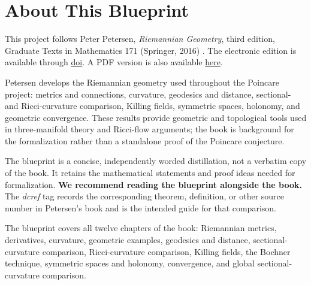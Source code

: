 
\chapter*{About This Blueprint}

This project follows Peter Petersen, \emph{Riemannian Geometry}, third edition,
Graduate Texts in Mathematics 171 (Springer, 2016) \cite{petersen2016}. The
electronic edition is available through
\href{https://doi.org/10.1007/978-3-319-26654-1}{doi}.
A PDF version is also available
\href{https://ebooks.karbust.me/Mathematics/Peter\%20Petersen\%20-\%20Riemannian\%20Geometry\%20(1998)\%20[978-1-4757-6434-5].pdf}{here}.

Petersen develops the Riemannian geometry used throughout the Poincare
project: metrics and connections, curvature, geodesics and distance,
sectional- and Ricci-curvature comparison, Killing fields, symmetric spaces,
holonomy, and geometric convergence. These results provide geometric and
topological tools used in three-manifold theory and Ricci-flow arguments; the
book is background for the formalization rather than a standalone proof of the
Poincare conjecture.

The blueprint is a concise, independently worded distillation, not a verbatim
copy of the book. It retains the mathematical statements and proof ideas
needed for formalization. \textbf{We recommend reading the blueprint alongside
the book.} The \emph{dcref} tag records the corresponding theorem, definition,
or other source number in Petersen's book and is the intended guide for that
comparison.

The blueprint covers all twelve chapters of the book: Riemannian metrics,
derivatives, curvature, geometric examples, geodesics and distance,
sectional-curvature comparison, Ricci-curvature comparison, Killing fields,
the Bochner technique, symmetric spaces and holonomy, convergence, and global
sectional-curvature comparison.













